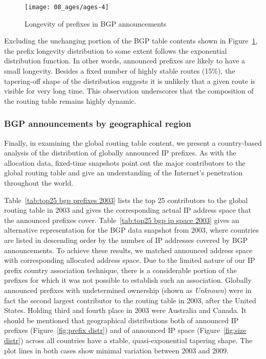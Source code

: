 \begin{figure}[htbp]
	\centering
		\texttt{[image: 08\_ages/ages-4]}
	\caption{Longevity of prefixes in BGP announcements}
	\label{fig:bgp ages}
\end{figure}

Excluding the unchanging portion of the BGP table contents shown in
Figure~\ref{fig:bgp ages}, the prefix longevity distribution to some extent
follows the exponential distribution function. In other words, announced
prefixes are likely to have a small longevity.  Besides a fixed number of
highly stable routes (15\%), the tapering-off shape of the distribution
suggests it is unlikely that a given route is visible for very long time. This
observation underscores that the composition of the routing table remains
highly dynamic.

\subsubsection{BGP announcements by geographical region}

Finally, in examining the global routing table content, we present a
country-based analysis of the distribution of globally announced IP prefixes.
As with the allocation data, fixed-time snapshots point out the major
contributors to the global routing table and give an understanding of the
Internet's penetration throughout the world.

Table~\ref{tab:top25 bgp prefixes 2003} lists the top 25 contributors to the
global routing table in 2003 and gives the corresponding actual IP address
space that the announced prefixes cover. Table~\ref{tab:top25 bgp ip space
2003} gives an alternative representation for the BGP data snapshot from 2003,
where countries are listed in descending order by the number of IP addresses
covered by BGP announcements. To achieve these results, we matched announced
address space with corresponding allocated address space.  Due to the limited
nature of our IP prefix country association technique, there is a considerable
portion of the prefixes for which it was not possible to establish such an
association. Globally announced prefixes with undetermined ownership (shown as
\emph{Unknown}) were in fact the second largest contributor to the routing
table in 2003, after the United States. Holding third and fourth place in 2003
were Australia and Canada. It should be mentioned that geographical
distributions both of announced IP prefixes (Figure~\ref{fig:prefix distr}) and
of announced IP space (Figure~\ref{fig:size distr}) across all countries have a
stable, quasi-exponential tapering shape.  The plot lines in both cases show
minimal variation between 2003 and 2009.

